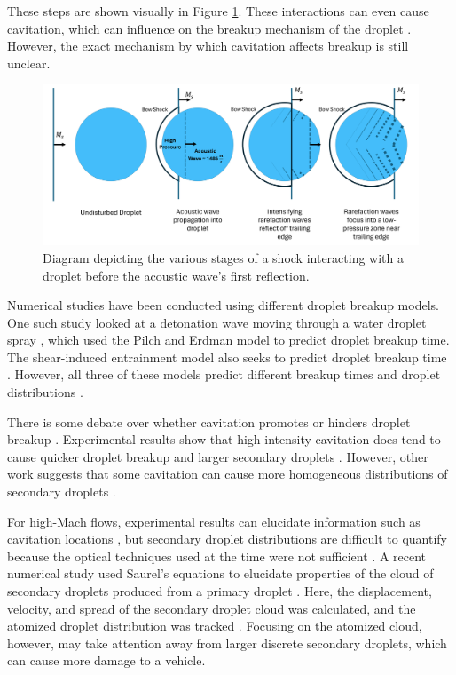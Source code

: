 \documentclass{UCF_ETD}
\begin{document}
These steps are shown visually in Figure \ref{fig:shockDropStages}. These interactions can even cause cavitation, which can influence on the breakup mechanism of the droplet \cite{Briggs2024, Forehand2024}. However, the exact mechanism by which cavitation affects breakup is still unclear.

\begin{figure}
    \centering
    \includegraphics[width=\linewidth]{Figures/stagesOfShockDrop.png}
    \caption{Diagram depicting the various stages of a shock interacting with a droplet before the acoustic wave's first reflection.}
    \label{fig:shockDropStages}
\end{figure}

Numerical studies have been conducted using different droplet breakup models. One such study looked at a detonation wave moving through a water droplet spray \cite{Xu2021EffectOW}, which used the Pilch and Erdman model to predict droplet breakup time. The shear-induced entrainment model also seeks to predict droplet breakup time \cite{Theofanus}. However, all three of these models predict different breakup times and droplet distributions \cite{Bielawski2024}. 

There is some debate over whether cavitation promotes or hinders droplet breakup \cite{Preiss_cav}. Experimental results show that high-intensity cavitation does tend to cause quicker droplet breakup and larger secondary droplets \cite{Preiss_cav, Gall2022, SCHLENDER201584, Freudig2003, Gothsch2011}. However, other work suggests that some cavitation can cause more homogeneous distributions of secondary droplets \cite{LOO1950692}.

For high-Mach flows, experimental results can elucidate information such as cavitation locations \cite{Briggs2024}, but secondary droplet distributions are difficult to quantify because the optical techniques used at the time were not sufficient \cite{nicholls1969}. 
A recent numerical study used Saurel's equations \cite{RICHARDSAUREL20091678} to elucidate properties of the cloud of secondary droplets produced from a primary droplet \cite{Bielawski2024}. Here, the displacement, velocity, and spread of the secondary droplet cloud was calculated, and the atomized droplet distribution was tracked \cite{Bielawski2024}. Focusing on the atomized cloud, however, may take attention away from larger discrete secondary droplets, which can cause more damage to a vehicle.
\end{document}
